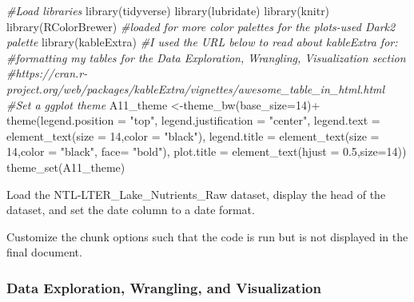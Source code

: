 \documentclass[
]{article}
\newenvironment{Shaded}{\begin{snugshade}}{\end{snugshade}}
\newcommand{\AttributeTok}[1]{\textcolor[rgb]{0.77,0.63,0.00}{#1}}
\newcommand{\CommentTok}[1]{\textcolor[rgb]{0.56,0.35,0.01}{\textit{#1}}}
\newcommand{\DecValTok}[1]{\textcolor[rgb]{0.00,0.00,0.81}{#1}}
\newcommand{\FloatTok}[1]{\textcolor[rgb]{0.00,0.00,0.81}{#1}}
\newcommand{\FunctionTok}[1]{\textcolor[rgb]{0.00,0.00,0.00}{#1}}
\newcommand{\NormalTok}[1]{#1}
\newcommand{\OtherTok}[1]{\textcolor[rgb]{0.56,0.35,0.01}{#1}}
\newcommand{\SpecialCharTok}[1]{\textcolor[rgb]{0.00,0.00,0.00}{#1}}
\newcommand{\StringTok}[1]{\textcolor[rgb]{0.31,0.60,0.02}{#1}}
\begin{document}
\begin{Shaded}
\begin{Highlighting}[]
\CommentTok{\#Load libraries}
\FunctionTok{library}\NormalTok{(tidyverse)}
\FunctionTok{library}\NormalTok{(lubridate)}
\FunctionTok{library}\NormalTok{(knitr)}
\FunctionTok{library}\NormalTok{(RColorBrewer) }\CommentTok{\#loaded for more color palettes for the plots{-}used Dark2 palette}
\FunctionTok{library}\NormalTok{(kableExtra)}
\CommentTok{\#I used the URL below to read about kableExtra for:}
\CommentTok{\#formatting my tables for the Data Exploration, Wrangling, Visualization section}
\CommentTok{\#https://cran.r{-}project.org/web/packages/kableExtra/vignettes/awesome\_table\_in\_html.html}
\CommentTok{\#Set a ggplot theme }
\NormalTok{A11\_theme }\OtherTok{\textless{}{-}}\FunctionTok{theme\_bw}\NormalTok{(}\AttributeTok{base\_size=}\DecValTok{14}\NormalTok{)}\SpecialCharTok{+}
            \FunctionTok{theme}\NormalTok{(}\AttributeTok{legend.position =} \StringTok{"top"}\NormalTok{, }
            \AttributeTok{legend.justification =} \StringTok{"center"}\NormalTok{,}
            \AttributeTok{legend.text =} \FunctionTok{element\_text}\NormalTok{(}\AttributeTok{size =} \DecValTok{14}\NormalTok{,}\AttributeTok{color =} \StringTok{"black"}\NormalTok{),}
            \AttributeTok{legend.title =} \FunctionTok{element\_text}\NormalTok{(}\AttributeTok{size =} \DecValTok{14}\NormalTok{,}\AttributeTok{color =} \StringTok{"black"}\NormalTok{,}
                                        \AttributeTok{face=} \StringTok{"bold"}\NormalTok{),}
            \AttributeTok{plot.title =} \FunctionTok{element\_text}\NormalTok{(}\AttributeTok{hjust =} \FloatTok{0.5}\NormalTok{,}\AttributeTok{size=}\DecValTok{14}\NormalTok{))}
\FunctionTok{theme\_set}\NormalTok{(A11\_theme)}
\end{Highlighting}
\end{Shaded}

Load the NTL-LTER\_Lake\_Nutrients\_Raw dataset, display the head of the
dataset, and set the date column to a date format.

Customize the chunk options such that the code is run but is not
displayed in the final document.

\hypertarget{data-exploration-wrangling-and-visualization}{%
\subsubsection{Data Exploration, Wrangling, and
Visualization}\label{data-exploration-wrangling-and-visualization}}
\end{document}
